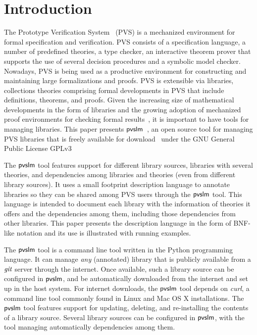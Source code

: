 \section{Introduction}
\label{sec.intro}

The Prototype Verification System~\cite{pvs-cade92} (PVS) is a
mechanized environment for formal specification and verification.  PVS
consists of a specification language, a number of predefined theories,
a type checker, an interactive theorem prover that supports the use of
several decision procedures and a symbolic model checker.  Nowadays,
PVS is being used as a productive environment for constructing and
maintaining large formalizations and proofs. PVS is extensible via
libraries, collections theories comprising formal developments in PVS
that include definitions, theorems, and proofs. Given the increasing
size of mathematical developments in the form of libraries and the
growing adoption of mechanized proof environments for checking formal
results~\cite{}, it is important to have tools for managing
libraries. This paper presents $\textsf{pvslm}$~\cite{pvslm}, an open source
tool for managing PVS libraries that is freely available for
download~\cite{pvslm} under the GNU General Public License GPLv3

The $\textsf{pvslm}$ tool features support for different library sources,
libraries with several theories, and dependencies among libraries and
theories (even from different library sources). It uses a small
footprint description language to annotate libraries so they can be
shared among PVS users through the $\textsf{pvslm}$ tool. This language is
intended to document each library with the information of theories it
offers and the dependencies among them, including those dependencies
from other libraries. This paper presents the description language in
the form of BNF-like notation and its use is illustrated with running
examples.

The $\textsf{pvslm}$ tool is a command line tool written in the Python
programming language. It can manage {\em any} (annotated) library that
is publicly available from a $\textit{git}$ server through the internet.
Once available, such a library source can be configured in $\textsf{pvslm}$,
and be automatically downloaded from the internet and set up in the
host system. For internet downloads, the $\textsf{pvslm}$ tool depends on {\em
  curl}, a command line tool commonly found in Linux and Mac OS X
installations. The $\textsf{pvslm}$ tool features support for updating,
deleting, and re-installing the contents of a library source.  Several
library sources can be configured in $\textsf{pvslm}$, with the tool managing
automatically dependencies among them.

